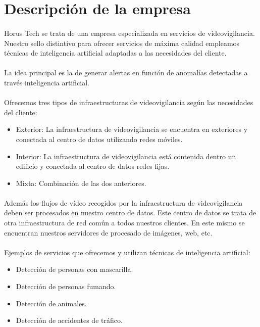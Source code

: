 \section{Descripción de la empresa}
\paragraph{}
Horus Tech se trata de una empresa especializada en servicios de videovigilancia. Nuestro sello distintivo para ofrecer servicios de máxima calidad empleamos técnicas de inteligencia artificial adaptadas a las necesidades del cliente.
\paragraph{}
La idea principal es la de generar alertas en función de anomalías detectadas a través inteligencia artificial.
\paragraph{}
Ofrecemos tres tipos de infraestructuras de videovigilancia según las necesidades del cliente:
\begin{itemize}
	\item Exterior: La infraestructura de videovigilancia se encuentra en exteriores y conectada al centro de datos utilizando redes móviles.
	\item Interior: La infraestructura de videovigilancia está contenida dentro un edificio y conectada al centro de datos redes fijas.
	\item Mixta: Combinación de las dos anteriores.
\end{itemize}
\paragraph{}
Además los flujos de vídeo recogidos por la infraestructura de videovigilancia deben ser procesados en nuestro centro de datos. Este centro de datos se trata de otra infraestructura de red común a todos nuestros clientes. En este mismo se encuentran nuestros servidores de procesado de imágenes, web, etc.
\paragraph{}
Ejemplos de servicios que ofrecemos y utilizan técnicas de inteligencia artificial:
\begin{itemize}
	\item Detección de personas con mascarilla.
	\item Detección de personas fumando.
	\item Detección de animales.
	\item Detección de accidentes de tráfico.
\end{itemize}
